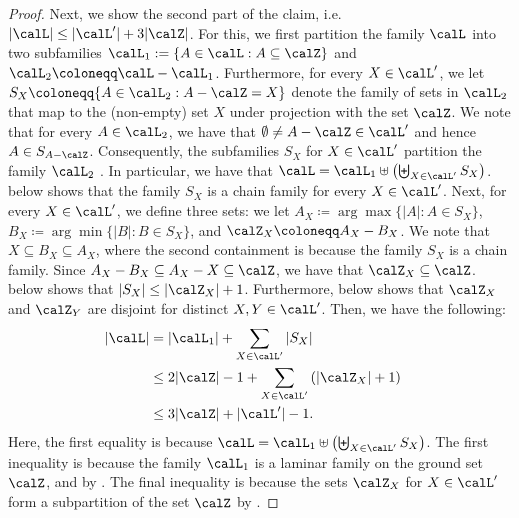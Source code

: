 \begin{proof}
    Next, we show the second part of the claim, i.e. $|\calL| \leq |\calL'| + 3|\calZ|$. For this, we first  partition the family $\calL$ into two subfamilies $\calL_1 : = \{A \in \calL : A \subseteq \calZ\}$ and $\calL_2 \coloneqq  \calL - \calL_1$. Furthermore, for every $X \in \calL'$, we let $S_X \coloneqq  \{A \in \calL_2 : A - \calZ = X\}$ denote the family of sets in $\calL_2$ that map to the (non-empty) set $X$ under projection with the set $\calZ$. 
    We note that for every $A \in \calL_2$, we have that $\emptyset \not = A - \calZ \in \calL'$ and hence $A \in S_{A - \calZ}$. Consequently, the subfamilies $S_X$ for $X \in \calL'$ partition the family $\calL_2$ 
    . In particular, we have that $\calL = \calL_1 \uplus \left(\biguplus_{X \in \calL'} S_X \right)$.  below shows that the family $S_X$ is a chain family for every $X \in \calL'$. Next, for every $X \in \calL'$, we define three sets: we let $A_X \coloneqq  \arg\max\{|A| : A \in S_X\}$, $B_{X} \coloneqq  \arg\min\{|B| : B \in S_X\}$, and $\calZ_X\coloneqq A_X-B_X$. 
    We note that $X \subseteq B_X \subseteq A_X$, where the second containment is because the family $S_X$ is a chain family. 
    Since $A_X - B_X \subseteq A_X - X \subseteq \calZ$, we have that $\calZ_X \subseteq \calZ$.  below shows that $|S_X| \leq |\calZ_X| + 1$. Furthermore,  below shows that $\calZ_X$ and $\calZ_Y$ are disjoint for distinct $X,Y \in \calL'$. Then, we have the following:
\begin{align*}
        |\calL| & = |\calL_1| + \sum_{X \in \calL'} |S_X|&\\
        & \leq 2|\calZ| - 1 + \sum_{X \in \calL'}\left(|\calZ_X| + 1\right)&\\
        &\le 3|\calZ| + |\calL'|-1.&
    \end{align*}
    Here, the first equality is because $\calL = \calL_1 \uplus \left(\biguplus_{X \in \calL'} S_X \right)$. The first inequality is because the family $\calL_1$ is a laminar family on the ground set $\calZ$, and by . The final inequality is because the sets $\calZ_X$ for $X \in\calL'$ form a subpartition of the set $\calZ$ by .
\end{proof}

